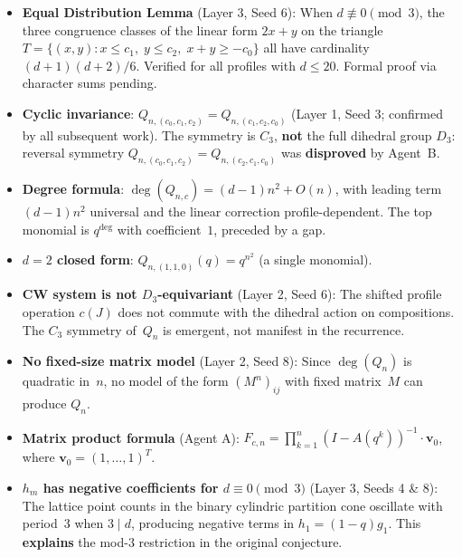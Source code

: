 \documentclass[11pt]{article}
\theoremstyle{definition}
\begin{document}
\begin{itemize}
\item \textbf{Equal Distribution Lemma} (Layer 3, Seed 6): When $d \not\equiv 0\!\pmod{3}$, the three congruence classes of the linear form $2x + y$ on the triangle $T = \{(x,y) : x \leq c_1,\; y \leq c_2,\; x + y \geq -c_0\}$ all have cardinality $(d+1)(d+2)/6$. Verified for all profiles with $d \leq 20$. Formal proof via character sums pending.

\item \textbf{Cyclic invariance}: $Q_{n,(c_0,c_1,c_2)} = Q_{n,(c_1,c_2,c_0)}$ (Layer 1, Seed 3; confirmed by all subsequent work). The symmetry is $C_3$, \textbf{not} the full dihedral group $D_3$: reversal symmetry $Q_{n,(c_0,c_1,c_2)} = Q_{n,(c_2,c_1,c_0)}$ was \textbf{disproved} by Agent~B.

\item \textbf{Degree formula}: $\deg(Q_{n,c}) = (d-1)n^2 + O(n)$, with leading term $(d-1)n^2$ universal and the linear correction profile-dependent. The top monomial is $q^{\deg}$ with coefficient~$1$, preceded by a gap.

\item \textbf{$d = 2$ closed form}: $Q_{n,(1,1,0)}(q) = q^{n^2}$ (a single monomial).

\item \textbf{CW system is not $D_3$-equivariant} (Layer 2, Seed 6): The shifted profile operation $c(J)$ does not commute with the dihedral action on compositions. The $C_3$ symmetry of~$Q_n$ is emergent, not manifest in the recurrence.

\item \textbf{No fixed-size matrix model} (Layer 2, Seed 8): Since $\deg(Q_n)$ is quadratic in~$n$, no model of the form $(M^n)_{ij}$ with fixed matrix~$M$ can produce $Q_n$.

\item \textbf{Matrix product formula} (Agent A): $F_{c,n} = \prod_{k=1}^n (I - A(q^k))^{-1} \cdot \mathbf{v}_0$, where $\mathbf{v}_0 = (1, \ldots, 1)^T$.

\item \textbf{$h_m$ has negative coefficients for $d \equiv 0\!\pmod{3}$} (Layer 3, Seeds 4 \& 8): The lattice point counts in the binary cylindric partition cone oscillate with period~3 when $3 \mid d$, producing negative terms in $h_1 = (1-q) g_1$. This \textbf{explains} the mod-3 restriction in the original conjecture.
\end{itemize}
\end{document}
